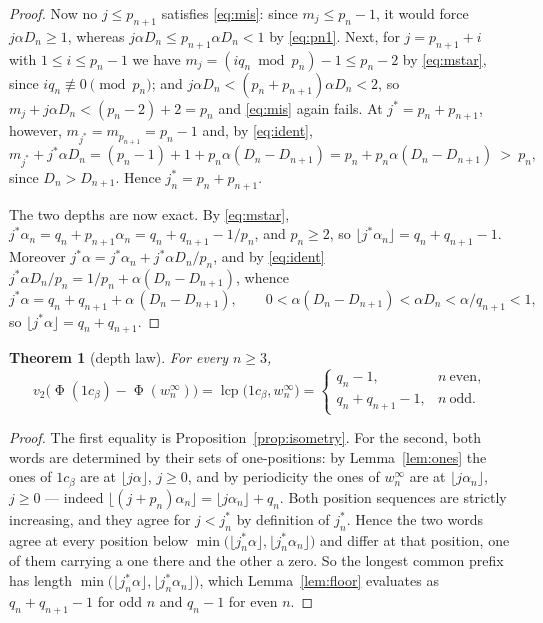 \documentclass[11pt,reqno]{amsart}
\theoremstyle{plain}
\newtheorem{theorem}{Theorem}[section]
\theoremstyle{definition}
\newcommand{\vt}{v_2}
\newcommand{\lcp}{\operatorname{lcp}}
\DeclareMathOperator{\Ph}{\Phi}
\begin{document}
\begin{proof}
Now no $j\le p_{n+1}$ satisfies \eqref{eq:mis}: since $m_j\le p_n-1$, it would
force $j\alpha D_n\ge1$, whereas $j\alpha D_n\le p_{n+1}\alpha D_n<1$ by
\eqref{eq:pn1}. Next, for
$j=p_{n+1}+i$ with $1\le i\le p_n-1$ we have $m_j=(iq_n\bmod p_n)-1\le p_n-2$ by
\eqref{eq:mstar}, since $iq_n\not\equiv0\pmod{p_n}$; and
$j\alpha D_n<(p_n+p_{n+1})\alpha D_n<2$, so
$m_j+j\alpha D_n<(p_n-2)+2=p_n$ and \eqref{eq:mis} again fails. At
$j^{*}=p_n+p_{n+1}$, however, $m_{j^{*}}=m_{p_{n+1}}=p_n-1$ and, by
\eqref{eq:ident},
\[
m_{j^{*}}+j^{*}\alpha D_n=(p_n-1)+1+p_n\alpha(D_n-D_{n+1})
= p_n+p_n\alpha(D_n-D_{n+1})\ >\ p_n ,
\]
since $D_n>D_{n+1}$. Hence $j^{*}_n=p_n+p_{n+1}$.

The two depths are now exact. By \eqref{eq:mstar},
$j^{*}\alpha_n=q_n+p_{n+1}\alpha_n=q_n+q_{n+1}-1/p_n$, and $p_n\ge2$, so
$\lfloor j^{*}\alpha_n\rfloor=q_n+q_{n+1}-1$. Moreover
$j^{*}\alpha=j^{*}\alpha_n+j^{*}\alpha D_n/p_n$, and by \eqref{eq:ident}
$j^{*}\alpha D_n/p_n=1/p_n+\alpha(D_n-D_{n+1})$, whence
\[
j^{*}\alpha=q_n+q_{n+1}+\alpha\,(D_n-D_{n+1}),\qquad
0<\alpha(D_n-D_{n+1})<\alpha D_n<\alpha/q_{n+1}<1 ,
\]
so $\lfloor j^{*}\alpha\rfloor=q_n+q_{n+1}$.
\end{proof}

\begin{theorem}[depth law]\label{thm:depth}
For every $n\ge3$,
\[
\vt\bigl(\Ph(1c_\beta)-\Ph(w_n^\infty)\bigr)=\lcp\bigl(1c_\beta,w_n^\infty\bigr)
=\begin{cases}
q_n-1, & n\ \text{even},\\[2pt]
q_n+q_{n+1}-1, & n\ \text{odd}.
\end{cases}
\]
\end{theorem}

\begin{proof}
The first equality is Proposition~\ref{prop:isometry}. For the second, both words
are determined by their sets of one-positions: by Lemma~\ref{lem:ones} the ones
of $1c_\beta$ are at $\lfloor j\alpha\rfloor$, $j\ge0$, and by periodicity the
ones of $w_n^\infty$ are at $\lfloor j\alpha_n\rfloor$, $j\ge0$ --- indeed
$\lfloor (j+p_n)\alpha_n\rfloor=\lfloor j\alpha_n\rfloor+q_n$. Both position
sequences are strictly increasing, and they agree for $j<j^{*}_n$ by definition
of $j^{*}_n$. Hence the two words agree at every position below
$\min\bigl(\lfloor j^{*}_n\alpha\rfloor,\lfloor j^{*}_n\alpha_n\rfloor\bigr)$ and
differ at that position, one of them carrying a one there and the other a zero.
So the longest common prefix has length
$\min\bigl(\lfloor j^{*}_n\alpha\rfloor,\lfloor j^{*}_n\alpha_n\rfloor\bigr)$,
which Lemma~\ref{lem:floor} evaluates as $q_n+q_{n+1}-1$ for odd $n$ and $q_n-1$
for even $n$.
\end{proof}
\end{document}
